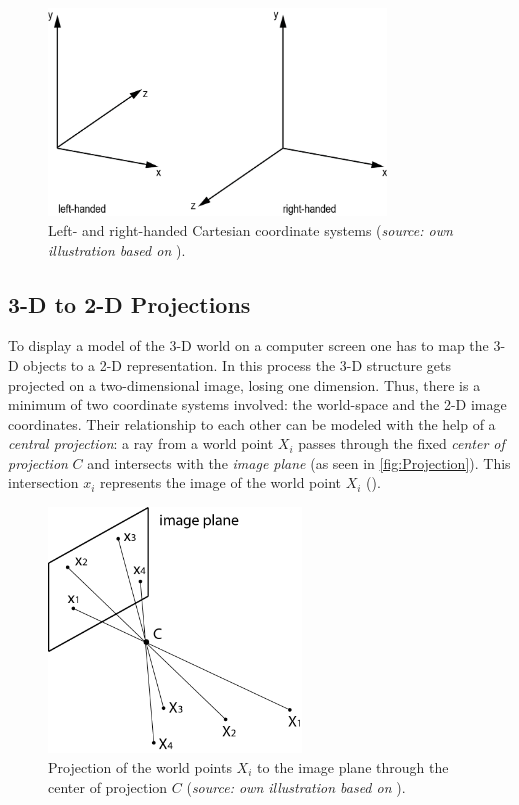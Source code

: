 \begin{figure}[htbp]
		\centering
		\includegraphics[width=0.8\textwidth]{figures/CoordinateSystems}
		\caption[Left- and right-handed Cartesian coordinate systems]{Left- and right-handed Cartesian coordinate systems (\textit{source: own illustration based on} \cite[p.167]{Gregory.2014}).}
		\label{fig:CoordinateSys}
\end{figure}

\subsection{3-D to 2-D Projections}\label{ssec:projection}
To display a model of the 3-D world on a computer screen one has to map the 3-D objects to a 2-D representation. In this process the 3-D structure gets projected on a two-dimensional image, losing one dimension. Thus, there is a minimum of two coordinate systems involved: the world-space and the 2-D image coordinates. Their relationship to each other can be modeled with the help of a \textit{central projection}: a ray from a world point $X_i$ passes through the fixed \textit{center of projection} $C$ and intersects with the \textit{image plane} (as seen in \autoref{fig:Projection}). This intersection $x_i$ represents the image of the world point $X_i$ (\cite[p.6 et seq.]{Hartley.2011}).

\begin{figure}[htbp]
		\centering
		\includegraphics[width=0.6\textwidth]{figures/Projection}
		\caption[Projection of the world points $X_i$ to the image plane through $C$]{Projection of the world points $X_i$ to the image plane through the center of projection $C$ (\textit{source: own illustration based on} \cite[p.8]{Hartley.2011}).}
		\label{fig:Projection}
\end{figure}

